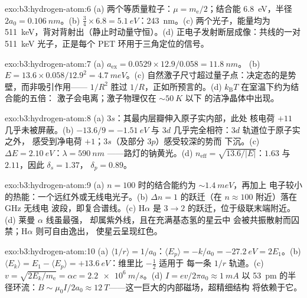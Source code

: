 \begin{solution}{exo:b3:hydrogen-atom:6}
(a) 两个等质量粒子：$\mu = m_{\text{e}}/2$；结合能
\qty{6.8}{eV}，半径 $2a_0 = \qty{0.106}{nm}$。(b) $\tfrac34
\times 6.8 = \qty{5.1}{eV}$：\qty{243}{nm}。(c) 两个光子，能量均为
\qty{511}{keV}，背对背射出（静止时动量守恒）。(d)
正电子发射断层成像：共线的一对
\qty{511}{keV} 光子，正是每个 PET 环用于三角定位的信号。
\end{solution}

\begin{solution}{exo:b3:hydrogen-atom:7}
(a) $a_{\text{ex}} = 0.0529 \times 12.9/0.058 = \qty{11.8}{nm}$。
(b) $E = 13.6 \times 0.058/12.9^2 = \qty{4.7}{meV}$。(c)
自然激子尺寸超过量子点：决定态的是势壁，而非吸引作用——
$1/R^2$ 胜过 $1/R$，正如所预言的。(d)
$k_{\text{B}}T$ 在室温下约为结合能的五倍：
激子会电离；激子物理仅在 $\sim\qty{50}{K}$ 以下
的洁净晶体中出现。
\end{solution}

\begin{solution}{exo:b3:hydrogen-atom:8}
(a) $3s$：其最内层瓣伸入原子实内部，此处
核电荷 $+11$ 几乎未被屏蔽。(b) $-13.6/9 = \qty{-1.51}{eV}$
与 $3d$ 几乎完全相符：$3d$ 轨道位于原子实之外，
感受到净电荷 $+1$；$3s$（及部分 $3p$）感受较深的势而
下沉。(c) $\Delta E = \qty{2.10}{eV}$：$\lambda = \qty{590}{nm}$
——路灯的钠黄光。(d) $n_{\text{eff}} =
\sqrt{13.6/|E|}$：$1.63$ 与 $2.11$，因此 $\delta_s = 1.37$，
$\delta_p = 0.89$。
\end{solution}

\begin{solution}{exo:b3:hydrogen-atom:9}
(a) $n = 100$ 时的结合能约为 $\sim\qty{1.4}{meV}$，再加上
电子较小的热能：一个远红外或无线电光子。(b)
$\Delta n = 1$ 的跃迁（在 $n \approx 100$ 附近）落在 GHz 无线电
波段，即复合谱线。(c) H$\alpha$ 是 $3 \to
2$ 的跃迁，位于级联末端附近。(d) 莱曼 $\alpha$ 线虽最强，
却属紫外线，且在充满基态氢的星云中
会被共振散射而囚禁；H$\alpha$ 则可自由逸出，
使星云呈现红色。
\end{solution}

\begin{solution}{exo:b3:hydrogen-atom:10}
(a) $\langle 1/r\rangle = 1/a_0$：$\langle E_p\rangle = -k/a_0 =
\qty{-27.2}{eV} = 2E_1$。(b) $\langle E_k\rangle = E_1 - \langle
E_p\rangle = +\qty{13.6}{eV}$：维里比 $-\tfrac12$ 适用于
每一条 $1/r$ 轨道。(c) $v = \sqrt{2E_k/m_{\text{e}}} = \alpha c =
\qty{2.2e6}{m/s}$。(d) $I = ev/2\pi a_0 \approx \qty{1}{mA}$
以 \qty{53}{pm} 的半径环流：$B \sim \mu_0I/2a_0 \approx
\qty{12}{T}$——这一巨大的内部磁场，超精细结构
将依赖于它。
\end{solution}

